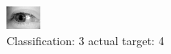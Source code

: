 \begin{figure}[h!]
\begin{center}
\includegraphics[width=0.60\columnwidth]{figures/ID3228_class_3_target_4.png}
\end{center}
\caption{ Classification: 3 actual target: 4}
\label{fig:ID3228_class_3_target_4}
\end{figure}
